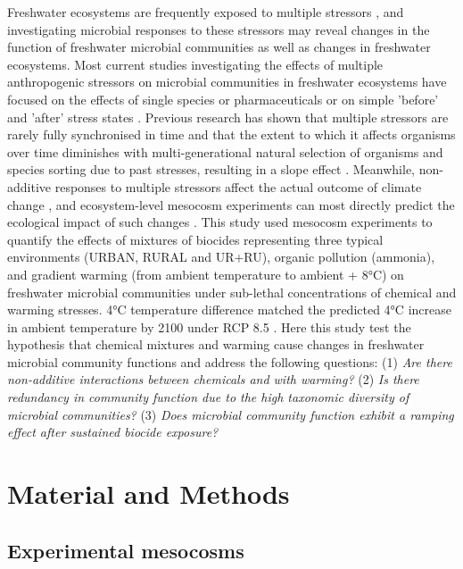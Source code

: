 \documentclass[11pt, a4paper]{article}
\begin{document}
\begin{spacing}{1.5}
Freshwater ecosystems are frequently exposed to multiple stressors \citep{muturi2017effect}, and investigating microbial responses to these stressors may reveal changes in the function of freshwater microbial communities as well as changes in freshwater ecosystems. Most current studies investigating the effects of multiple anthropogenic stressors on microbial communities in freshwater ecosystems have focused on the effects of single species or pharmaceuticals or on simple 'before' and 'after' stress states \citep{bitton1992bacterial, downing2004effects, widenfalk2008effects}. Previous research has shown that multiple stressors are rarely fully synchronised in time and that the extent to which it affects organisms over time diminishes with multi-generational natural selection of organisms and species sorting due to past stresses, resulting in a slope effect \citep{gibert2015scaling,pawar2015metabolic,hughes2019ecological}. Meanwhile, non-additive responses to multiple stressors affect the actual outcome of climate change \citep{woodward2010climate}, and ecosystem-level mesocosm experiments can most directly predict the ecological impact of such changes \citep{feuchtmayr2009global}. This study used mesocosm experiments to quantify the effects of mixtures of biocides representing three typical environments (URBAN, RURAL and UR+RU), organic pollution (ammonia), and gradient warming (from ambient temperature to ambient + 8°C) on freshwater microbial communities under sub-lethal concentrations of chemical and warming stresses. 4°C temperature difference matched the predicted 4°C increase in ambient temperature by 2100 under RCP 8.5 \citep{stocker2014climate}. Here this study test the hypothesis that chemical mixtures and warming cause changes in freshwater microbial community functions and address the following questions: (1) \textit{Are there non-additive interactions between chemicals and with warming?} (2) \textit{Is there redundancy in community function due to the high taxonomic diversity of microbial communities?} (3) \textit{Does microbial community function exhibit a ramping effect after sustained biocide exposure?} 

\section{Material and Methods}

\subsection{Experimental mesocosms}


\end{spacing}
\end{document}
